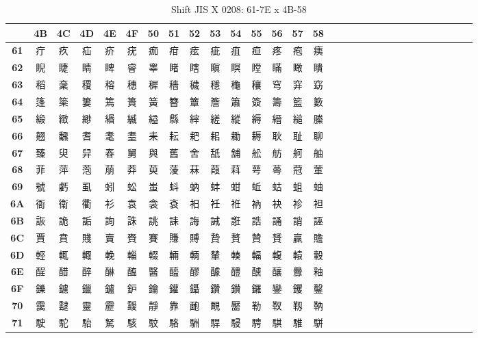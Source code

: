 \begin{table}[H]
\centering
\caption{Shift JIS X 0208: 61-7E x 4B-58}
\begin{tabular}{|Sc|Sc|Sc|Sc|Sc|Sc|Sc|Sc|Sc|Sc|Sc|Sc|Sc|Sc|Sc|}
\hline
 & \textbf{4B} & \textbf{4C} & \textbf{4D} & \textbf{4E} & \textbf{4F} & \textbf{50} & \textbf{51} & \textbf{52} & \textbf{53} & \textbf{54} & \textbf{55} & \textbf{56} & \textbf{57} & \textbf{58} \\ \hline
\textbf{61} & 疔 & 疚 & 疝 & 疥 & 疣 & 痂 & 疳 & 痃 & 疵 & 疽 & 疸 & 疼 & 疱 & 痍 \\ \hline
\textbf{62} & 睨 & 睫 & 睛 & 睥 & 睿 & 睾 & 睹 & 瞎 & 瞋 & 瞑 & 瞠 & 瞞 & 瞰 & 瞶 \\ \hline
\textbf{63} & 稻 & 稾 & 稷 & 穃 & 穗 & 穉 & 穡 & 穢 & 穩 & 龝 & 穰 & 穹 & 穽 & 窈 \\ \hline
\textbf{64} & 篷 & 簗 & 簍 & 篶 & 簣 & 簧 & 簪 & 簟 & 簷 & 簫 & 簽 & 籌 & 籃 & 籔 \\ \hline
\textbf{65} & 緞 & 緻 & 緲 & 緡 & 縅 & 縊 & 縣 & 縡 & 縒 & 縱 & 縟 & 縉 & 縋 & 縢 \\ \hline
\textbf{66} & 翹 & 飜 & 耆 & 耄 & 耋 & 耒 & 耘 & 耙 & 耜 & 耡 & 耨 & 耿 & 耻 & 聊 \\ \hline
\textbf{67} & 臻 & 臾 & 舁 & 舂 & 舅 & 與 & 舊 & 舍 & 舐 & 舖 & 舩 & 舫 & 舸 & 舳 \\ \hline
\textbf{68} & 菲 & 萍 & 萢 & 萠 & 莽 & 萸 & 蔆 & 菻 & 葭 & 萪 & 萼 & 蕚 & 蒄 & 葷 \\ \hline
\textbf{69} & 號 & 虧 & 虱 & 蚓 & 蚣 & 蚩 & 蚪 & 蚋 & 蚌 & 蚶 & 蚯 & 蛄 & 蛆 & 蚰 \\ \hline
\textbf{6A} & 衙 & 衞 & 衢 & 衫 & 袁 & 衾 & 袞 & 衵 & 衽 & 袵 & 衲 & 袂 & 袗 & 袒 \\ \hline
\textbf{6B} & 詼 & 詭 & 詬 & 詢 & 誅 & 誂 & 誄 & 誨 & 誡 & 誑 & 誥 & 誦 & 誚 & 誣 \\ \hline
\textbf{6C} & 賈 & 賁 & 賤 & 賣 & 賚 & 賽 & 賺 & 賻 & 贄 & 贅 & 贊 & 贇 & 贏 & 贍 \\ \hline
\textbf{6D} & 輕 & 輒 & 輙 & 輓 & 輜 & 輟 & 輛 & 輌 & 輦 & 輳 & 輻 & 輹 & 轅 & 轂 \\ \hline
\textbf{6E} & 酲 & 醋 & 醉 & 醂 & 醢 & 醫 & 醯 & 醪 & 醵 & 醴 & 醺 & 釀 & 釁 & 釉 \\ \hline
\textbf{6F} & 鑠 & 鑢 & 鑞 & 鑪 & 鈩 & 鑰 & 鑵 & 鑷 & 鑽 & 鑚 & 鑼 & 鑾 & 钁 & 鑿 \\ \hline
\textbf{70} & 靄 & 靆 & 靈 & 靂 & 靉 & 靜 & 靠 & 靤 & 靦 & 靨 & 勒 & 靫 & 靱 & 靹 \\ \hline
\textbf{71} & 駛 & 駝 & 駘 & 駑 & 駭 & 駮 & 駱 & 駲 & 駻 & 駸 & 騁 & 騏 & 騅 & 駢 \\ \hline

\end{tabular}
\end{table}
